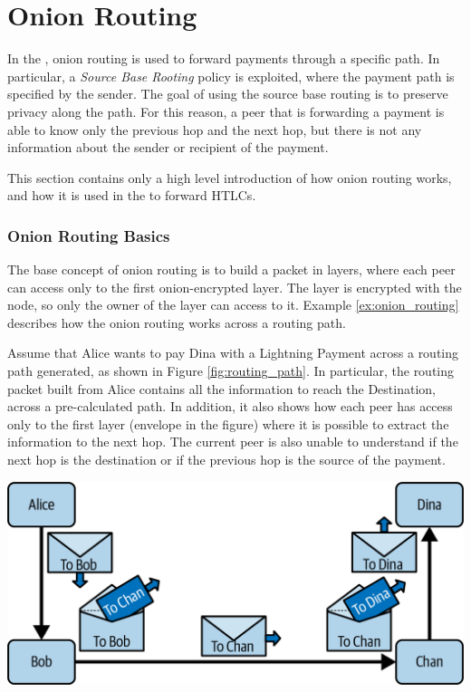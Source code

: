 \section{Onion Routing}\label{sec:onion_routing}

In the {\LN}, onion routing is used to forward payments through a specific path.
In particular, a \emph{Source Base Rooting} policy is exploited, where the payment path is specified by the sender.
The goal of using the source base routing is to preserve privacy along the path. For this reason, a peer that
is forwarding a payment is able to know only the previous hop and the next hop, but there is not any information
about the sender or recipient of the payment.

This section contains only a high level introduction of how onion routing works, and how it is used in the {\LN} to forward HTLCs.

\subsubsection{Onion Routing Basics}

The base concept of onion routing is to build a packet in layers, where each peer can access only to the
first onion-encrypted layer. The layer is encrypted with the node, so only the owner of the layer can access to it.
Example \ref{ex:onion_routing} describes how the onion routing works across a routing path.

\begin{example}
  \label{ex:onion_routing}
  Assume that Alice wants to pay Dina with a Lightning Payment across a routing path generated, as shown in Figure \ref{fig:routing_path}.
  In particular, the routing packet built from Alice contains all the
  information to reach the Destination, across a pre-calculated path.
  In addition, it also shows how each peer has access only to the first layer (envelope in the figure) where it is possible to extract the information to the next hop.
  The current peer is also unable to understand if the next hop is the destination or if the previous hop is the source of the payment.

  {\centering
    \includegraphics[width=0.6\columnwidth]{imgs/mtln_1007.png}
    \par}
\end{example}


